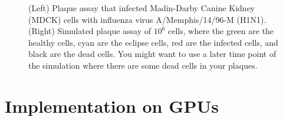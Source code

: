 \begin{figure}[h]
    \centering

\caption{(Left) Plaque assay that infected Madin-Darby Canine Kidney (MDCK) cells with influenza virus A/Memphis/14/96-M (H1N1). (Right) Simulated plaque assay of $10^{6}$ cells, where the green are the healthy cells, cyan are the eclipse cells, red are the infected cells, and black are the dead cells. \color{red} You might want to use a later time point of the simulation where there are some dead cells in your plaques.\color{black} \label{fig_Plaques}}
\end{figure}

\section{Implementation on GPUs}

